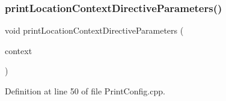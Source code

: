\subsubsection{\texorpdfstring{print\+Location\+Context\+Directive\+Parameters()}{printLocationContextDirectiveParameters()}}
{\footnotesize\ttfamily void print\+Location\+Context\+Directive\+Parameters (\begin{DoxyParamCaption}\item[{\hyperlink{classft_1_1_location_block}{ft\+::\+Location\+Block} \&}]{context }\end{DoxyParamCaption})\hspace{0.3cm}{\ttfamily [static]}}



Definition at line 50 of file Print\+Config.\+cpp.


